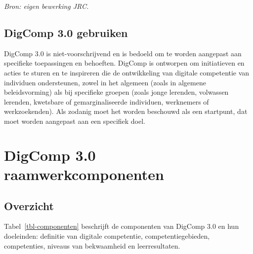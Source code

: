 \documentclass[
  dutch,
  letterpaper,
  DIV=11,
  numbers=noendperiod]{scrartcl}
\begin{document}
\emph{Bron: eigen bewerking JRC.}

\subsection{DigComp 3.0 gebruiken}\label{sec-digcomp-3.0-gebruiken}

DigComp 3.0 is niet-voorschrijvend en is bedoeld om te worden aangepast
aan specifieke toepassingen en behoeften. DigComp is ontworpen om
initiatieven en acties te sturen en te inspireren die de ontwikkeling
van digitale competentie van individuen ondersteunen, zowel in het
algemeen (zoals in algemene beleidsvorming) als bij specifieke groepen
(zoals jonge lerenden, volwassen lerenden, kwetsbare of
gemarginaliseerde individuen, werknemers of werkzoekenden). Als zodanig
moet het worden beschouwd als een startpunt, dat moet worden aangepast
aan een specifiek doel.

\newpage{}

\section{DigComp 3.0
raamwerkcomponenten}\label{sec-digcomp-3.0-raamwerkcomponenten}

\subsection{Overzicht}\label{sec-overzicht}

Tabel~\ref{tbl-componenten} beschrijft de componenten van DigComp 3.0 en
hun doeleinden: definitie van digitale competentie, competentiegebieden,
competenties, niveaus van bekwaamheid en leerresultaten.
\end{document}
